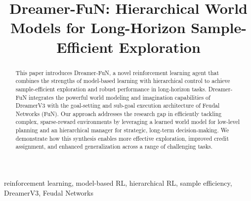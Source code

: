 \documentclass[conference]{IEEEtran}
\begin{document}
\title{Dreamer-FuN: Hierarchical World Models for Long-Horizon Sample-Efficient Exploration}

\author{
\and
{}
\and
{}
}

\maketitle

\begin{abstract}
This paper introduces Dreamer-FuN, a novel reinforcement learning agent that combines the strengths of model-based learning with hierarchical control to achieve sample-efficient exploration and robust performance in long-horizon tasks. Dreamer-FuN integrates the powerful world modeling and imagination capabilities of DreamerV3 with the goal-setting and sub-goal execution architecture of Feudal Networks (FuN). Our approach addresses the research gap in efficiently tackling complex, sparse-reward environments by leveraging a learned world model for low-level planning and an hierarchical manager for strategic, long-term decision-making. We demonstrate how this synthesis enables more effective exploration, improved credit assignment, and enhanced generalization across a range of challenging tasks.
\end{abstract}

\begin{IEEEkeywords}
reinforcement learning, model-based RL, hierarchical RL, sample efficiency, DreamerV3, Feudal Networks
\end{IEEEkeywords}
\end{document}
